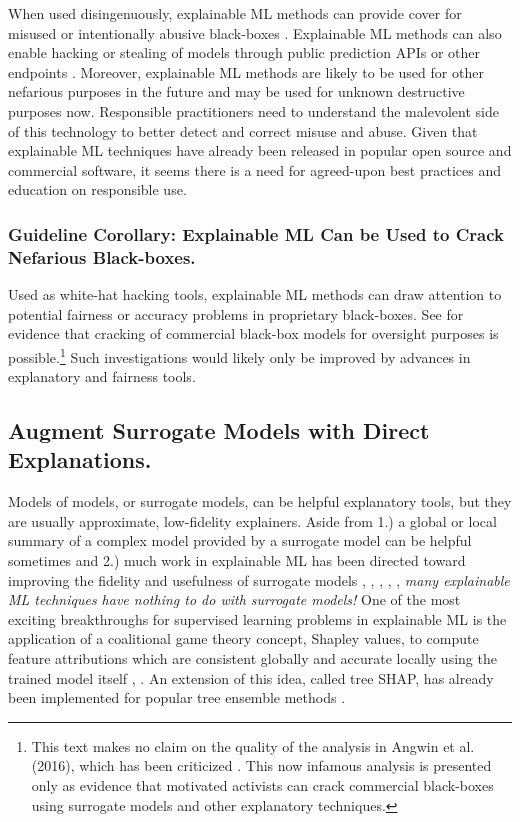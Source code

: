 \documentclass[fleqn]{article}
\begin{document}
When used disingenuously, explainable ML methods can provide cover for misused or intentionally abusive black-boxes \cite{fair_washing}. Explainable ML methods can also enable hacking or stealing of models through public prediction APIs or other endpoints \cite{model_stealing}. Moreover, explainable ML methods are likely to be used for other nefarious purposes in the future and may be used for unknown destructive purposes now. Responsible practitioners need to understand the malevolent side of this technology to better detect and correct misuse and abuse. Given that explainable ML techniques have already been released in popular open source and commercial software, it seems there is a need for agreed-upon best practices and education on responsible use.\\

\subsubsection{Guideline Corollary: Explainable ML Can be Used to Crack Nefarious Black-boxes.}

Used as white-hat hacking tools, explainable ML methods can draw attention to potential fairness or accuracy problems in proprietary black-boxes. See \citet{angwin16} for evidence that cracking of commercial black-box models for oversight purposes is possible.\footnote{This text makes no claim on the quality of the analysis in Angwin et al. (2016), which has been criticized \cite{flores2016false}. This now infamous analysis is presented only as evidence that motivated activists can crack commercial black-boxes using surrogate models and other explanatory techniques.} Such investigations would likely only be improved by advances in explanatory and fairness tools.

\subsection{Augment Surrogate Models with Direct Explanations.}

Models of models, or surrogate models, can be helpful explanatory tools, but they are usually approximate, low-fidelity explainers. Aside from 1.) a global or local summary of a complex model provided by a surrogate model can be helpful sometimes and 2.) much work in explainable ML has been directed toward improving the fidelity and usefulness of surrogate models \cite{dt_surrogate2}, \cite{viper}, \cite{dt_surrogate1}, \cite{lime-sup}, \cite{wf_xnn}, \textit{many explainable ML techniques have nothing to do with surrogate models!} One of the most exciting breakthroughs for supervised learning problems in explainable ML is the application of a coalitional game theory concept, Shapley values, to compute feature attributions which are consistent globally and accurate locally using the trained model itself \cite{shapley}, \cite{kononenko2010efficient}. An extension of this idea, called tree SHAP, has already been implemented for popular tree ensemble methods \cite{tree_shap}. 
\end{document}
